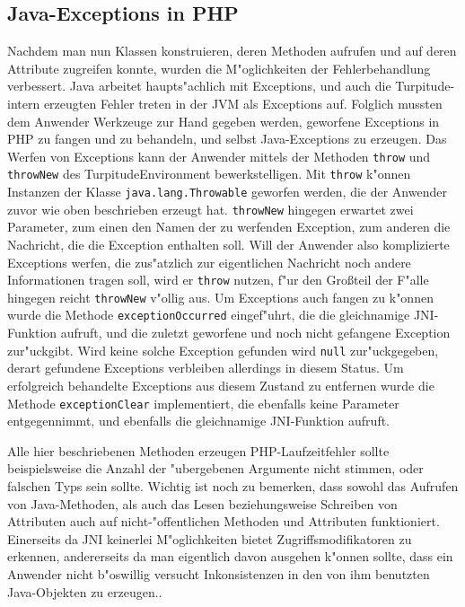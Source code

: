 \subsection{Java-Exceptions in PHP}
\label{sec:chap1:impl:8}

Nachdem man nun Klassen konstruieren, deren Methoden aufrufen und auf deren Attribute zugreifen konnte, wurden die M"oglichkeiten der Fehlerbehandlung
verbessert. Java arbeitet haupts"achlich mit Exceptions, und auch die Turpitude-intern erzeugten Fehler treten in der JVM als Exceptions auf. Folglich mussten dem
Anwender Werkzeuge zur Hand gegeben werden, geworfene Exceptions in PHP zu fangen und zu behandeln, und selbst Java-Exceptions zu erzeugen. Das Werfen von
Exceptions kann der Anwender mittels der Methoden \texttt{throw} und \texttt{throwNew} des TurpitudeEnvironment bewerkstelligen. Mit \texttt{throw} k"onnen Instanzen
der Klasse \texttt{java.lang.Throwable} geworfen werden, die der Anwender zuvor wie oben beschrieben erzeugt hat. \texttt{throwNew} hingegen erwartet zwei Parameter,
zum einen den Namen der zu werfenden Exception, zum anderen die Nachricht, die die Exception enthalten soll. Will der Anwender also komplizierte Exceptions
werfen, die zus"atzlich zur eigentlichen Nachricht noch andere Informationen tragen soll, wird er \texttt{throw} nutzen, f"ur den Gro\ss teil der F"alle 
hingegen reicht \texttt{throwNew} v"ollig aus. Um Exceptions auch fangen zu k"onnen wurde die Methode \texttt{exceptionOccurred} eingef"uhrt, die die gleichnamige
JNI-Funktion aufruft, und die zuletzt geworfene und noch nicht gefangene Exception zur"uckgibt. Wird keine solche Exception gefunden wird \texttt{null} zur"uckgegeben,
derart gefundene Exceptions verbleiben allerdings in diesem Status. Um erfolgreich behandelte Exceptions aus diesem Zustand zu entfernen wurde die Methode
\texttt{exceptionClear} implementiert, die ebenfalls keine Parameter entgegennimmt, und ebenfalls die gleichnamige JNI-Funktion aufruft.

Alle hier beschriebenen Methoden erzeugen PHP-Laufzeitfehler sollte beispielsweise die Anzahl der "ubergebenen Argumente nicht stimmen, oder falschen Typs sein sollte.
Wichtig ist noch zu bemerken, dass sowohl das Aufrufen von Java-Methoden, als auch das Lesen beziehungsweise Schreiben von Attributen auch auf nicht-"offentlichen
Methoden und Attributen funktioniert. Einerseits da JNI keinerlei M"oglichkeiten bietet Zugriffsmodifikatoren zu erkennen, andererseits da man eigentlich davon
ausgehen k"onnen sollte, dass ein Anwender nicht b"oswillig versucht Inkonsistenzen in den von ihm benutzten Java-Objekten zu erzeugen.. 

